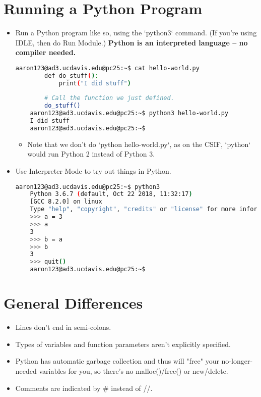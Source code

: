 \documentclass{article}
\begin{document}
\section{Running a Python Program}
\begin{itemize}
    \item Run a Python program like so, using the `python3` command. (If you're using IDLE, then do Run Module.) \textbf{Python is an interpreted language -- no compiler needed.}
    \begin{lstlisting}[language=bash]
    aaron123@ad3.ucdavis.edu@pc25:~$ cat hello-world.py 
        def do_stuff():
            print("I did stuff")
        
        # Call the function we just defined.
        do_stuff()
    aaron123@ad3.ucdavis.edu@pc25:~$ python3 hello-world.py 
    I did stuff
    aaron123@ad3.ucdavis.edu@pc25:~$ 
    \end{lstlisting}
    \begin{itemize}
        \item Note that we don't do `python hello-world.py`, as on the CSIF, `python` would run Python 2 instead of Python 3.
    \end{itemize}
    \item Use Interpreter Mode to try out things in Python.
    \begin{lstlisting}[language=bash]
    aaron123@ad3.ucdavis.edu@pc25:~$ python3
    Python 3.6.7 (default, Oct 22 2018, 11:32:17) 
    [GCC 8.2.0] on linux
    Type "help", "copyright", "credits" or "license" for more information.
    >>> a = 3
    >>> a
    3
    >>> b = a
    >>> b
    3
    >>> quit()
    aaron123@ad3.ucdavis.edu@pc25:~$ 
    \end{lstlisting}
\end{itemize}

\section{General Differences}
\begin{itemize}
    \item Lines don't end in semi-colons.
    \item Types of variables and function parameters aren't explicitly specified.
    \item Python has automatic garbage collection and thus will "free" your no-longer-needed variables for you, so there's no malloc()/free() or new/delete.
    \item Comments are indicated by # instead of //.
\end{itemize}
\end{document}
